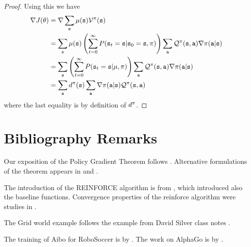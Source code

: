 \begin{proof}
Using this we have
\begin{align*}
\nabla J(\theta) &= \nabla \sum_{{\tt s}} \mu({\tt s}) \mathcal{V}^\pi ({\tt s})\\
&= \sum_{\tt s} \mu({\tt s}) \left(\sum_{t=0}^\infty P({\tt s}_t = {\tt s} | {\tt s}_0 = {\tt s}, \pi) \right) \sum_{\tt a} \mathcal{Q}^\pi ({\tt s},{\tt a}) \nabla\pi({\tt a}|{\tt s}) \\
&= \sum_{\tt s} \left(\sum_{t=0}^\infty P({\tt s}_t = {\tt s} | \mu, \pi) \right) \sum_{\tt a} \mathcal{Q}^\pi ({\tt s},{\tt a}) \nabla\pi({\tt a}|{\tt s}) \\
&= \sum_{\tt s} d^{\pi}({\tt s}) \sum_{\tt a} \nabla\pi({\tt a}|{\tt s}) \mathcal{Q}^\pi ({\tt s},{\tt a}) \\
\end{align*}
where the last equality is by definition of $d^{\pi}$.
\end{proof}




\section{Bibliography Remarks}

Our exposition of the Policy Gradient Theorem follows \cite{SuttonMSM99}. Alternative formulations of the theorem appears in \cite{MarbachT01,MarbachT03} and \cite{BaxterB01}.

The introduction of the REINFORCE algorithm is from \cite{Williams92}, which introduced also the baseline functions. Convergence properties of the reinforce algorithm were studies in \cite{PhansalkarT95}.

The Grid world example follows the example from David Silver class notes \cite{SilverClass}.

The training of Aibo for RoboSoccer is by \cite{KohlS04}.
The work on AlphaGo is by \cite{SilverHMGSDSAPL16}.




